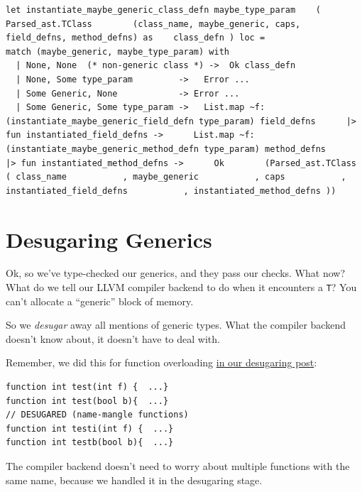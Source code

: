 %

\begin{lstlisting}[language=caml,caption={type\_generics.ml}]
let instantiate_maybe_generic_class_defn maybe_type_param    ( Parsed_ast.TClass        (class_name, maybe_generic, caps, field_defns, method_defns) as    class_defn ) loc =  
match (maybe_generic, maybe_type_param) with  
  | None, None  (* non-generic class *) ->  Ok class_defn
  | None, Some type_param         ->   Error ...
  | Some Generic, None            -> Error ...
  | Some Generic, Some type_param ->   List.map ~f:(instantiate_maybe_generic_field_defn type_param) field_defns      |> fun instantiated_field_defns ->      List.map ~f:(instantiate_maybe_generic_method_defn type_param) method_defns      |> fun instantiated_method_defns ->      Ok        (Parsed_ast.TClass           ( class_name           , maybe_generic           , caps           , instantiated_field_defns           , instantiated_method_defns ))
\end{lstlisting}

\hypertarget{desugaring-generics}{%
\section{\texorpdfstring{\protect\hyperlink{desugaring-generics}{}Desugaring
Generics}{Desugaring Generics}}\label{desugaring-generics}}

Ok, so we've type-checked our generics, and they pass our checks. What
now? What do we tell our LLVM compiler backend to do when it encounters
a \texttt{T}? You can't allocate a ``generic'' block of memory.

So we \emph{desugar} away all mentions of generic types. What the
compiler backend doesn't know about, it doesn't have to deal with.

Remember, we did this for function overloading
\href{https://mukulrathi.com/create-your-own-programming-language/lower-language-constructs-to-llvm/}{in
our desugaring post}:


\begin{verbatim}
function int test(int f) {  ...}
function int test(bool b){  ...}
// DESUGARED (name-mangle functions)
function int testi(int f) {  ...}
function int testb(bool b){  ...}
\end{verbatim}

The compiler backend doesn't need to worry about multiple functions with
the same name, because we handled it in the desugaring stage.

